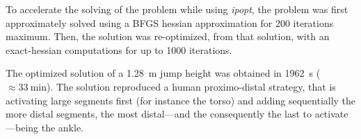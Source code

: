 To accelerate the solving of the problem while using \emph{ipopt}, the problem was first approximately solved using a BFGS hessian approximation for 200 iterations maximum.
Then, the solution was re-optimized, from that solution, with an exact-hessian computations for up to 1000 iterations.

The optimized solution of a \SI{1.28}{\meter} jump height was obtained in \SI{1962}{\second} ($\approx\SI{33}{\minute}$).
The solution reproduced a human proximo-distal strategy, that is activating large segments first (for instance the torso) and adding sequentially the more distal segments, the most distal---and the consequently the last to activate---being the ankle.

